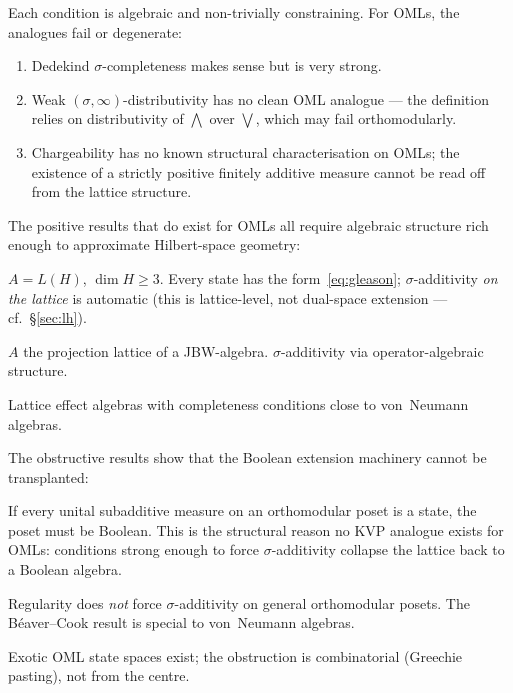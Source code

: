 \documentclass[11pt]{article}
\theoremstyle{definition}
\begin{document}
Each condition is algebraic and non-trivially constraining.  For
OMLs, the analogues fail or degenerate:
\begin{enumerate}[label=(\alph*), noitemsep]
  \item Dedekind $\sigma$-completeness makes sense but is very
    strong.
  \item Weak $(\sigma,\infty)$-distributivity has no clean OML
    analogue --- the definition relies on distributivity of
    $\bigwedge$ over $\bigvee$, which may fail orthomodularly.
  \item Chargeability has no known structural characterisation on
    OMLs; the existence of a strictly positive finitely additive
    measure cannot be read off from the lattice structure.
\end{enumerate}

The positive results that do exist for OMLs all require algebraic
structure rich enough to approximate Hilbert-space geometry:
\begin{description}[style=nextline, font=\normalfont\bfseries,
    labelwidth=4cm, leftmargin=4.5cm]
  \item[Gleason~\cite{Gleason1957}]
    $A = L(H)$, $\dim H \geq 3$.  Every state has the
    form~\eqref{eq:gleason}; $\sigma$-additivity \emph{on the lattice}
    is automatic (this is lattice-level, not dual-space extension ---
    cf.\ \S\ref{sec:lh}).
  \item[Bunce--Wright~\cite{BunceWright1992}]
    $A$ the projection lattice of a JBW-algebra.
    $\sigma$-additivity via operator-algebraic structure.
  \item[Chetcuti--Dvure\v{c}enskij~\cite{ChetcutiDvurecenskij2005}]
    Lattice effect algebras with completeness conditions close to
    von~Neumann algebras.
\end{description}

The obstructive results show that the Boolean extension machinery
cannot be transplanted:
\begin{description}[style=nextline, font=\normalfont\bfseries,
    labelwidth=4cm, leftmargin=4.5cm]
  \item[Pt\'{a}k--Pulmannov\'{a}~\cite{PtakPulmannova1991}]
    If every unital subadditive measure on an orthomodular poset is
    a state, the poset must be Boolean.  This is the structural
    reason no KVP analogue exists for OMLs: conditions strong enough
    to force $\sigma$-additivity collapse the lattice back to a
    Boolean algebra.
  \item[Navara~\cite{Navara1992}]
    Regularity does \emph{not} force $\sigma$-additivity on general
    orthomodular posets.  The B\'{e}aver--Cook result is special to
    von~Neumann algebras.
  \item[Pt\'{a}k~\cite{Ptak1987}]
    Exotic OML state spaces exist; the obstruction is combinatorial
    (Greechie pasting), not from the centre.
\end{description}
\end{document}
